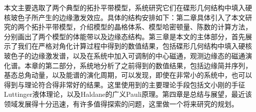 本文主要选取了两个典型的拓扑平带模型，系统研究它们在碟形几何结构中填入硬核玻色子所产生的边缘激发效应。具体的结构安排如下：第二章具体引入了本文研究的两个拓扑平带模型，介绍模型的晶格体系、模型哈密顿量、陈数的计算方法，分别画出了两个模型的体能带以及边缘态结构。第三章是本文的主体部分，首先展示了我们在严格对角化计算过程中得到的数值结果，包括碟形几何结构中填入硬核玻色子的边缘激发谱，以及在系统中加入可调制的中心磁通，观测边缘态的磁通演化谱。本章的第二部分，系统地分析了之前得到的数值结果，包括边缘简并序列，基态总角动量，以及能谱的演化周期，可以发现，即使在非常小的系统中，也可以得到与理论符合得非常好的结果。这里使用到的主要理论手段包括文小刚的手征Luttinger液体理论，以及Haldane的广义Pauli原理。第四章是总结与展望，最近该领域发展得十分迅速，有许多值得探索的问题，这里做一个将来研究的规划。
